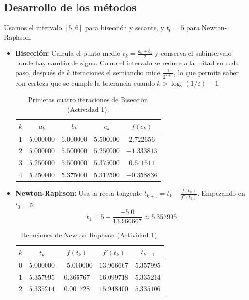 \documentclass[11pt,a4paper]{article}
\begin{document}
\subsection{Desarrollo de los métodos}
Usamos el intervalo $[5, 6]$ para bisección y secante, y $t_0 = 5$ para Newton-Raphson.

\begin{itemize}[leftmargin=*]
    \item \textbf{Bisección:} Calcula el punto medio $c_k = \frac{a_k + b_k}{2}$ y conserva el subintervalo donde hay cambio de signo. Como el intervalo se reduce a la mitad en cada paso, después de $k$ iteraciones el semiancho mide $\frac{1}{2^{k+1}}$, lo que permite saber con certeza que se cumple la tolerancia cuando $k > \log_2(1/\varepsilon) - 1$.
    \begin{table}[h!]
        \centering
        \caption{Primeras cuatro iteraciones de Bisección (Actividad 1).}
        \begin{tabular}{ccccc}
            \toprule
            $k$ & $a_k$ & $b_k$ & $c_k$ & $f(c_k)$ \\
            \midrule
            $1$ & $5.000000$ & $6.000000$ & $5.500000$ & $2.722656$ \\
            $2$ & $5.000000$ & $5.500000$ & $5.250000$ & $-1.333813$ \\
            $3$ & $5.250000$ & $5.500000$ & $5.375000$ & $0.641511$ \\
            $4$ & $5.250000$ & $5.375000$ & $5.312500$ & $-0.358836$ \\
            \bottomrule
        \end{tabular}
    \end{table}

    \item \textbf{Newton-Raphson:} Usa la recta tangente $t_{k+1} = t_k - \frac{f(t_k)}{f'(t_k)}$. Empezando en $t_0 = 5$:
    \begin{equation}
        t_1 = 5 - \frac{-5.0}{13.966667} \approx 5.357995
    \end{equation}
    \begin{table}[h!]
        \centering
        \caption{Iteraciones de Newton-Raphson (Actividad 1).}
        \begin{tabular}{ccccc}
            \toprule
            $k$ & $t_k$ & $f(t_k)$ & $f'(t_k)$ & $t_{k+1}$ \\
            \midrule
            $0$ & $5.000000$ & $-5.000000$ & $13.966667$ & $5.357995$ \\
            $1$ & $5.357995$ & $0.366767$ & $16.099718$ & $5.335214$ \\
            $2$ & $5.335214$ & $0.001728$ & $15.948400$ & $5.335106$ \\
            \bottomrule
        \end{tabular}
    \end{table}


\end{itemize}
\end{document}
